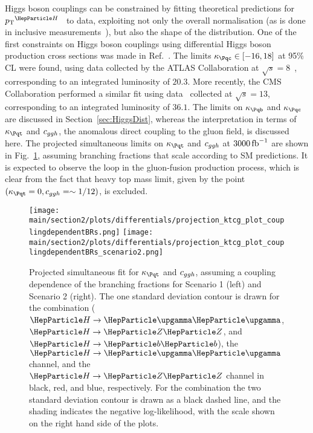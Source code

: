 \label{sec:diffxsinterpretation}


Higgs boson couplings can be constrained by fitting theoretical predictions for $\pTH$~\cite{Bishara:2016jga,Grazzini:2017szg,Grazzini:2016paz} to data, exploiting not only the overall normalisation (as is done in inclusive measurements~\cite{%
Khachatryan:2016vau,%
Aad:2015zhl,%
CMS:2018lkl%
}), but also the shape of the distribution.
% 
One of the first constraints on Higgs boson couplings using differential Higgs boson production cross sections was made in Ref.~\cite{Bishara:2016jga}.
% 
The limits $\kappac \in [ -16, 18 ]$ at 95\% CL were found, using data collected by the ATLAS Collaboration at $\sqrt{s}=8$\UTeV~\cite{Aad:2015lha}, corresponding to an integrated luminosity of $20.3$\fbinv.
% 
More recently, the CMS Collaboration performed a similar fit using data~\cite{CMS-PAS-HIG-17-028} collected at $\sqrt{s}=13$\UTeV, corresponding to an integrated luminosity of $36.1$\fbinv.
% 
The limits on $\kappab$ and $\kappac$ are discussed in Section~\ref{sec:HiggsDist}, whereas the interpretation in terms of $\kappat$ and $c_{ggh}$, the anomalous direct coupling to the gluon field, is discussed here.
% 
The projected simultaneous limits on $\kappat$ and $c_{ggh}$ at $3000\mbox{\ensuremath{\,\text{fb}^\text{$-$1}}}$ are shown in Fig.~\ref{fig:ktcg_couplingdependentBRs}, assuming branching fractions that scale according to SM predictions.
% 
It is expected to observe the loop in the gluon-fusion production process, which is clear from the fact that heavy top mass limit, given by the point $(\kappat =0, \cg=\sim 1/12)$, is excluded.

\begin{figure}[hbtp]
  \begin{center}
    \texttt{[image: \\main/section2/plots/differentials/projection\_ktcg\_plot\_couplingdependentBRs.png]}
    \texttt{[image: \\main/section2/plots/differentials/projection\_ktcg\_plot\_couplingdependentBRs\_scenario2.png]}
    \caption{
        Projected simultaneous fit for $\kappat$ and $c_{ggh}$, assuming a coupling dependence of the branching fractions for Scenario 1 (left) and Scenario 2 (right).
        The one standard deviation contour is drawn for the combination ($\hgg$, $\hzz$, and $\hbb$), the $\hgg$ channel, and the $\hzz$ channel in black, red, and blue, respectively.
        For the combination the two standard deviation contour is drawn as a black dashed line, and the shading indicates the negative log-likelihood, with the scale shown on the right hand side of the plots.
        }
    \label{fig:ktcg_couplingdependentBRs}
  \end{center}
\end{figure}

